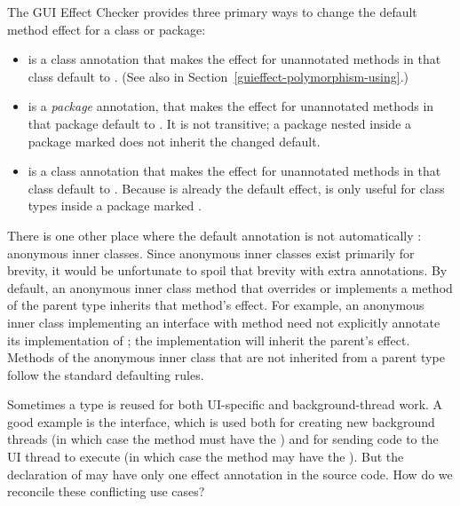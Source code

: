 The GUI Effect Checker provides three primary ways to change the default method effect for a class
or package:
\begin{itemize}
\item
  is a class annotation that makes the effect for unannotated methods in that
class default to
.  (See also  in Section~\ref{guieffect-polymorphism-using}.)
\item
  is a \emph{package} annotation, that makes the effect for unannotated
methods in that package default to .  It is not transitive; a package nested inside
a package marked  does not inherit the changed default.
\item
   is a class annotation that makes the effect for unannotated methods in that
class default to .  Because  is already the default
effect,  is only useful for class types inside a package marked .
\end{itemize}

There is one other place where the default annotation is not automatically :
anonymous inner classes.  Since anonymous inner classes exist primarily for brevity, it would be
unfortunate to spoil that brevity with extra annotations.  By default, an anonymous inner class
method that overrides or implements a method of the parent type inherits that method's effect.
For example, an anonymous inner class implementing an interface with method  need not explicitly annotate its implementation of ; the implementation will inherit
the parent's effect.  Methods of the anonymous inner class that are not inherited from a parent type
follow the standard defaulting rules.



Sometimes a type is reused for both UI-specific and background-thread work.  A good example is the
 interface, which is used both for creating new background threads (in which case the
 method must have the ) and for sending code to the UI thread to
execute (in which case the  method may have the
).  But the declaration of
 may have only one effect annotation in the source code.
How do we reconcile these
conflicting use cases?

